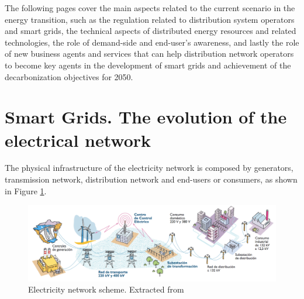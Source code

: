 The following pages cover the main aspects related to the current scenario in the energy transition, such as the regulation related to distribution system operators and smart grids, the technical aspects of distributed energy resources and related technologies, the role of demand-side and end-user's awareness, and lastly the role of new business agents and services that can help distribution network operators to become key agents in the development of smart grids and achievement of the decarbonization objectives for 2050. 


\section{Smart Grids. The evolution of the electrical network}

The physical infrastructure of the electricity network is composed by generators, transmission network, distribution network and end-users or consumers, as shown in Figure \ref{fig:ree}. 

\begin{figure}[htbp]
	\centering 
	\includegraphics[width=1\columnwidth ]{ChapterIntro/Figures/ree.png}
		\caption{Electricity network scheme. Extracted from \cite{RedElectricadeEspana}}  
		\label{fig:ree}
\end{figure}


